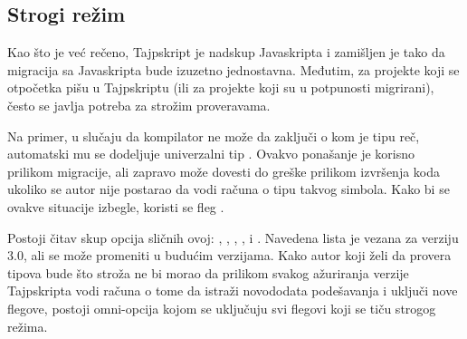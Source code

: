 \subsection{Strogi režim}

Kao što je već rečeno, Tajpskript je nadskup Javaskripta i zamišljen je tako da migracija sa Javaskripta bude izuzetno jednostavna.
Međutim, za projekte koji se otpočetka pišu u Tajpskriptu (ili za projekte koji su u potpunosti migrirani), često se javlja potreba za strožim proveravama.

Na primer, u slučaju da kompilator ne može da zaključi o kom je tipu reč, automatski mu se dodeljuje univerzalni tip .
Ovakvo ponašanje je korisno prilikom migracije, ali zapravo može dovesti do greške prilikom izvršenja koda ukoliko se autor nije postarao da vodi računa o tipu takvog simbola.
Kako bi se ovakve situacije izbegle, koristi se fleg .

Postoji čitav skup opcija sličnih ovoj: , , , ,  i .
Navedena lista je vezana za verziju 3.0, ali se može promeniti u budućim verzijama.
Kako autor koji želi da provera tipova bude što stroža ne bi morao da prilikom svakog ažuriranja verzije Tajpskripta vodi računa o tome da istraži novododata podešavanja i uključi nove flegove, postoji omni-opcija  kojom se uključuju svi flegovi koji se tiču strogog režima.
